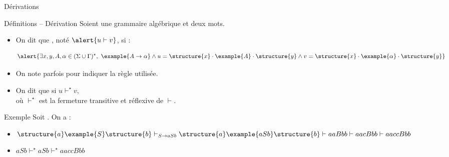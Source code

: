 
\begingroup

\begin{frame}{Dérivations}

  \begin{block}{Définitions -- Dérivation}
    Soient  une grammaire algébrique et  deux mots. 

    \begin{itemize}
    \item On dit que , noté $\alert{u \vdash v}$, si :

      $$\alert{\exists x, y, A, \alpha \in (\Sigma \cup \Gamma)^\star,~
        \example{A \rightarrow \alpha} \land u = \structure{x} \cdot \example{A} \cdot \structure{y} \land v = \structure{x} \cdot \example{\alpha} \cdot \structure{y}}$$

    \item On note parfois  pour indiquer la règle utilisée.

    \item On dit que  si \alert{$u \vdash^\star v$},\\
      où \alert{$\vdash^\star$ est la fermeture transitive et réflexive de $\vdash$}.

    \end{itemize}
  \end{block}

  \begin{exampleblock}{Exemple}
    Soit . On a :

    \vspace{2mm}
    \begin{itemize}
    \item $\structure{a}\example{S}\structure{b} \vdash_{S \rightarrow aSb} \structure{a}\example{aSb}\structure{b} \vdash aaBbb \vdash aacBbb \vdash aaccBbb$
    \item $aSb \vdash^\star aSb \vdash^\star aaccBbb$
    \end{itemize}
  \end{exampleblock}

\end{frame}

\endgroup
